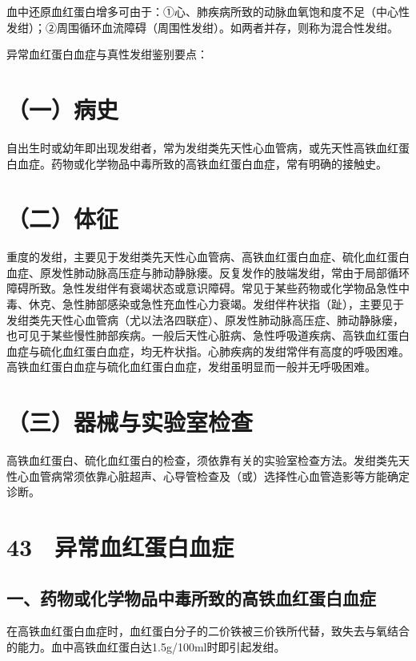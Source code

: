 血中还原血红蛋白增多可由于：①心、肺疾病所致的动脉血氧饱和度不足（中心性发绀）；②周围循环血流障碍（周围性发绀）。如两者并存，则称为混合性发绀。

异常血红蛋白血症与真性发绀鉴别要点：

\section{（一）病史}

自出生时或幼年即出现发绀者，常为发绀类先天性心血管病，或先天性高铁血红蛋白血症。药物或化学物品中毒所致的高铁血红蛋白血症，常有明确的接触史。

\section{（二）体征}

重度的发绀，主要见于发绀类先天性心血管病、高铁血红蛋白血症、硫化血红蛋白血症、原发性肺动脉高压症与肺动静脉瘘。反复发作的肢端发绀，常由于局部循环障碍所致。急性发绀伴有衰竭状态或意识障碍。常见于某些药物或化学物品急性中毒、休克、急性肺部感染或急性充血性心力衰竭。发绀伴杵状指（趾），主要见于发绀类先天性心血管病（尤以法洛四联症）、原发性肺动脉高压症、肺动静脉瘘，也可见于某些慢性肺部疾病。一般后天性心脏病、急性呼吸道疾病、高铁血红蛋白血症与硫化血红蛋白血症，均无杵状指。心肺疾病的发绀常伴有高度的呼吸困难。高铁血红蛋白血症与硫化血红蛋白血症，发绀虽明显而一般并无呼吸困难。

\section{（三）器械与实验室检查}

高铁血红蛋白、硫化血红蛋白的检查，须依靠有关的实验室检查方法。发绀类先天性心血管病常须依靠心脏超声、心导管检查及（或）选择性心血管造影等方能确定诊断。

\protect\hypertarget{text00119.html}{}{}

\section{43　异常血红蛋白血症}

\subsection{一、药物或化学物品中毒所致的高铁血红蛋白血症}

在高铁血红蛋白血症时，血红蛋白分子的二价铁被三价铁所代替，致失去与氧结合的能力。血中高铁血红蛋白达1.5g/100ml时即引起发绀。

